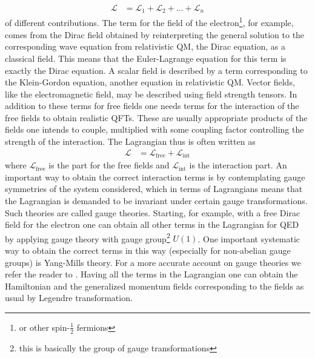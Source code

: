 \begin{align*}
  \mathcal{L}
  &=
  \mathcal{L}_{1}
  +
  \mathcal{L}_{2}
  +
  \ldots
  +
  \mathcal{L}_{n}
\end{align*}
of different contributions. The term for the field of the electron\footnote{or other spin-$\frac{1}{2}$ fermions}, for example, comes from the Dirac field obtained by {\glqq}reinterpreting{\grqq} the general solution to the corresponding wave equation from relativistic QM, the Dirac equation, as a classical field. This means that the Euler-Lagrange equation for this term is exactly the Dirac equation. A scalar field is described by a term corresponding to the Klein-Gordon equation, another equation in relativistic QM. Vector fields, like the electromagnetic field, may be described using field strength tensors. In addition to these terms for free fields one needs terms for the interaction of the free fields to obtain realistic QFTs. These are usually appropriate products of the fields one intends to couple, multiplied with some coupling factor controlling the strength of the interaction. The Lagrangian thus is often written as
\begin{align*}
  \mathcal{L}
  &=
  \mathcal{L}_{\textrm{free}}
  +
  \mathcal{L}_{\textrm{int}}
\end{align*}
where $\mathcal{L}_{\textrm{free}}$ is the part for the free fields and $\mathcal{L}_{\textrm{int}}$ is the interaction part. An important way to obtain the correct interaction terms is by contemplating gauge symmetries of the system considered, which in terms of Lagrangians means that the Lagrangian is demanded to be invariant under certain gauge transformations. Such theories are called gauge theories. Starting, for example, with a free Dirac field for the electron one can obtain all other terms in the Lagrangian for QED by applying gauge theory with gauge group\footnote{this is basically the group of gauge transformations} $U(1)$. One important systematic way to obtain the correct terms in this way (especially for non-abelian gauge groups) is Yang-Mills theory. For a more accurate account on gauge theories we refer the reader to \cite{00000001}. Having all the terms in the Lagrangian one can obtain the Hamiltonian and the generalized momentum fields corresponding to the fields as usual by Legendre transformation.
\\
